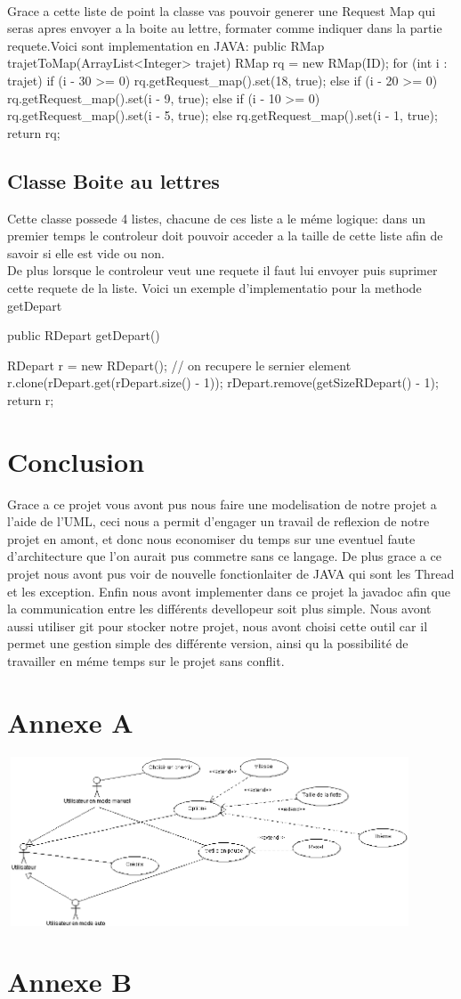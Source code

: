 \documentclass[a4paper, titlepage]{report}
\begin{document}
\\
Grace a cette liste de point la classe vas pouvoir generer une Request Map qui seras apres envoyer a la boite au lettre, formater comme indiquer  dans la partie requete.Voici sont implementation en JAVA:
public RMap trajetToMap(ArrayList<Integer> trajet) {
		RMap rq = new RMap(ID);
		for (int i : trajet) {
			if (i - 30 >= 0) {
				rq.getRequest_map().set(18, true);
			} else {
				if (i - 20 >= 0) {
					rq.getRequest_map().set(i - 9, true);
				} else {
					if (i - 10 >= 0) {
						rq.getRequest_map().set(i - 5, true);
					} else {
						rq.getRequest_map().set(i - 1, true);
					}
				}
			}
		}
		return rq;
	}
\section{Classe Boite au lettres}
Cette classe possede 4 listes, chacune de ces liste a le méme logique: dans un premier temps le controleur doit pouvoir acceder a la taille de cette liste afin de savoir si elle est vide ou non.
\\
De plus  lorsque le controleur veut une requete il faut lui envoyer puis suprimer cette requete de la liste. Voici un exemple d'implementatio pour la methode getDepart


public RDepart getDepart() {
		RDepart r = new RDepart();
		// on recupere le sernier element
		r.clone(rDepart.get(rDepart.size() - 1));
		rDepart.remove(getSizeRDepart() - 1);
		return r;

	}


\chapter*{Conclusion}
Grace a ce projet vous avont pus nous faire une modelisation de notre projet a l'aide de l'UML, ceci nous a permit d'engager un travail de reflexion de notre projet en amont, et donc nous economiser du temps sur une eventuel faute d'architecture que l'on aurait pus commetre sans ce langage. De plus grace a ce projet nous avont pus voir de nouvelle fonctionlaiter de JAVA qui sont les Thread et les exception. Enfin nous avont implementer dans ce projet la javadoc afin que la communication entre les différents devellopeur soit plus simple. Nous avont aussi utiliser git pour stocker notre projet, nous avont choisi cette outil car il permet une gestion simple des différente version, ainsi qu la possibilité de travailler en méme temps sur le projet sans conflit.
\appendix
\chapter*{Annexe A}
\includegraphics[width=455px, height=190px]{Images/CasUtilisation.PNG}
\chapter*{Annexe B}
\end{document}
